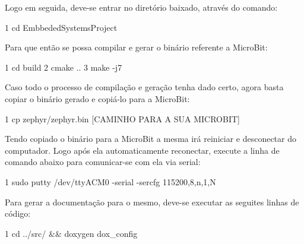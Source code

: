 Logo em seguida, deve-\/se entrar no diretório baixado, através do comando\+: 
\begin{DoxyCode}
1 cd EmbbededSystemsProject
\end{DoxyCode}


Para que então se possa compilar e gerar o binário referente a Micro\+Bit\+: 
\begin{DoxyCode}
1 cd build
2 cmake ..
3 make -j7
\end{DoxyCode}


Caso todo o processo de compilação e geração tenha dado certo, agora basta copiar o binário gerado e copiá-\/lo para a Micro\+Bit\+: 
\begin{DoxyCode}
1 cp zephyr/zephyr.bin [CAMINHO PARA A SUA MICROBIT]
\end{DoxyCode}


Tendo copiado o binário para a Micro\+Bit a mesma irá reiniciar e desconectar do computador. Logo após ela automaticamente reconectar, execute a linha de comando abaixo para comunicar-\/se com ela via serial\+: 
\begin{DoxyCode}
1 sudo putty /dev/ttyACM0 -serial -sercfg 115200,8,n,1,N
\end{DoxyCode}


Para gerar a documentação para o mesmo, deve-\/se executar as seguites linhas de código\+: 
\begin{DoxyCode}
1 cd ../src/ && doxygen dox\_config
\end{DoxyCode}
 